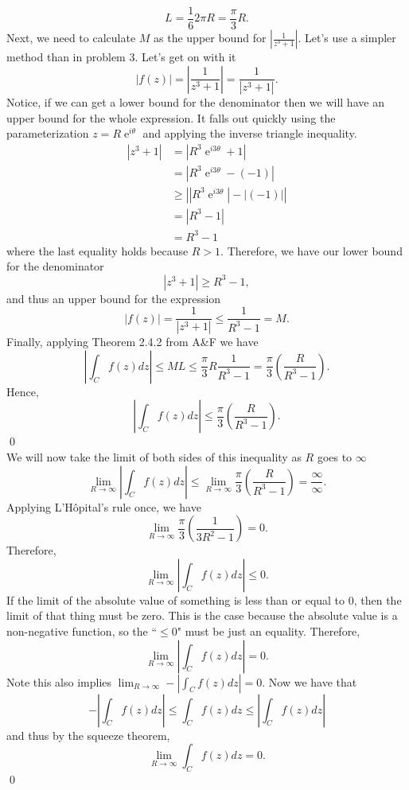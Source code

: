 \documentclass[10pt]{amsart}
\DeclareMathOperator{\E}{e}
\theoremstyle{nonumberplain}
\begin{document}
\begin{enumerate}[label={\bf {\arabic*}:}]
$$
L = \frac 1 6 2\pi R = \frac{\pi}{3} R.
$$
Next, we need to calculate $M$ as the upper bound for $\left| \frac{1}{z^3 + 1} \right|$.
Let's use a simpler method than in problem 3. Let's get on with it
$$
\left| f(z) \right| = \left| \frac 1 {z^3 + 1} \right| = \frac 1 {\left|z^3 + 1\right|}.
$$
Notice, if we can get a lower bound for the denominator then we will have an upper bound for the whole expression. It falls out quickly using the parameterization $z = R\E^{i\theta}$ and applying the inverse triangle inequality.
\begin{align*}
\left| z^3 + 1\right| &= \left| R^3\E^{i3\theta} + 1\right| \\
	&= \left| R^3\E^{i3\theta} - \left(-1\right)\right| \\
	&\geq \left| \left|R^3\E^{i3\theta}\right| - \left|\left(-1\right)\right|\right| \\
	&= \left| R^3 - 1\right| \\
	&= R^3 - 1
\end{align*}
where the last equality holds because $R > 1$.
Therefore, we have our lower bound for the denominator
$$
\left| z^3 + 1\right| \geq R^3 - 1,
$$
and thus an upper bound for the expression
$$
\left|f(z)\right| = \frac 1 {\left| z^3 + 1\right|} \leq \frac 1 {R^3 - 1} = M.
$$
Finally, applying Theorem 2.4.2 from A\&F we have
$$
\left| \int_C f(z) dz \right| \leq ML \leq \frac {\pi}{3} R\frac{1}{R^3 - 1} = \frac {\pi}{3} \left(\frac{R}{R^3 - 1}\right).
$$
Hence,
$$
\left| \int_C f(z) dz \right| \leq \frac {\pi}{3} \left(\frac{R}{R^3 - 1}\right).
$$
\qed \\
We will now take the limit of both sides of this inequality as $R$ goes to $\infty$
$$
\lim_{R \rightarrow \infty} \left| \int_C f(z) dz \right|
\leq \lim_{R \rightarrow \infty} \frac {\pi}{3} \left(\frac{R}{R^3 - 1}\right) = \frac \infty \infty.
$$
Applying L'Hôpital's rule once, we have
$$
\lim_{R \rightarrow \infty} \frac {\pi}{3} \left(\frac{1}{3R^2 - 1}\right) = 0.
$$
Therefore,
$$
\lim_{R \rightarrow \infty} \left| \int_C f(z) dz \right| \leq 0.
$$
If the limit of the absolute value of something is less than or equal to 0, then the limit of that thing must be zero.
This is the case because the absolute value is a non-negative function, so the ``$\leq 0 $" must be just an equality. Therefore,
$$
\lim_{R \rightarrow \infty} \left| \int_C f(z) dz \right| = 0.
$$
Note this also implies $\lim_{R \rightarrow \infty} -\left| \int_C f(z) dz \right| = 0$.
Now we have that
$$-\left| \int_C f(z) dz \right| \leq \int_C f(z) dz \leq \left| \int_C f(z) dz \right| $$
and thus by the squeeze theorem,
$$\lim_{R \rightarrow \infty} \int_C f(z) dz = 0.$$
\qed
\\


\end{enumerate}
\end{document}
